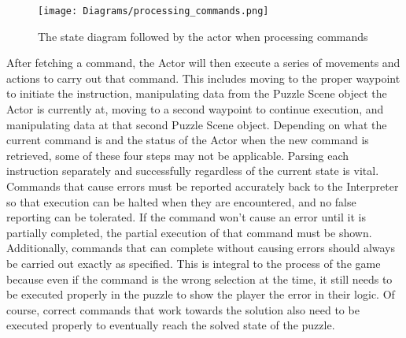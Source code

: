 \begin{figure}[!htb]
  \caption{The state diagram followed by the actor when processing commands}
  \label{fig:processing_commands}
  \centering
  \texttt{[image: Diagrams/processing\_commands.png]}
\end{figure}

After fetching a command, the Actor will then execute a series of movements and actions to 
carry out that command. This includes moving to the proper waypoint to initiate the instruction, 
manipulating data from the Puzzle Scene object the Actor is currently at, moving to a second 
waypoint to continue execution, and manipulating data at that second Puzzle Scene object. 
Depending on what the current command is and the status of the Actor when the new command 
is retrieved, some of these four steps may not be applicable. Parsing each instruction separately 
and successfully regardless of the current state is vital. Commands that cause errors must be 
reported accurately back to the Interpreter so that execution can be halted when they are 
encountered, and no false reporting can be tolerated. If the command won't cause an error 
until it is partially completed, the partial execution of that command must be shown. Additionally, 
commands that can complete without causing errors should always be carried out exactly as 
specified. This is integral to the process of the game because even if the command is the wrong 
selection at the time, it still needs to be executed properly in the puzzle to show the player the 
error in their logic. Of course, correct commands that work towards the solution also need to 
be executed properly to eventually reach the solved state of the puzzle.\\


